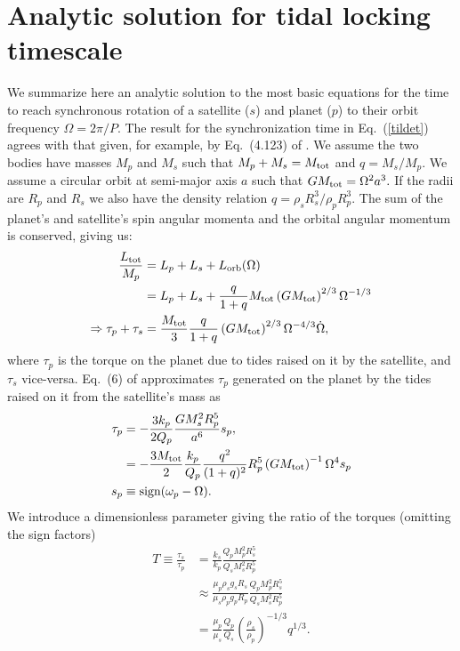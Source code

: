 \documentclass[onecolumn]{aastex631}
\begin{document}
\section{Analytic solution for tidal locking timescale}
\label{analytic}
We summarize here an analytic solution to the most basic equations for the time to reach synchronous rotation of a satellite ($s$) and planet ($p$) to their orbit frequency $\Omega = 2\pi/P.$ The result for the synchronization time in Eq.~(\ref{tildet}) agrees with that given, for example, by Eq.~(4.123) of \citet{MD2000}. We assume the two bodies have masses $M_p$ and $M_s$ such that $M_p+M_s=M_{\rm tot}$ and $q=M_s/M_p.$  We assume a circular orbit at semi-major axis $a$ such that $GM_{\rm tot}=\Omega^2 a^3.$  If the radii are $R_p$ and $R_s$ we also have the density relation $q = \rho_s R^3_s / \rho_p R^3_p.$  The sum of the planet's and satellite's spin angular momenta and the orbital angular momentum is conserved, giving us:
\begin{align}
  \frac{L_{\rm tot}}{M_p} & = L_p + L_s + L_{\rm orb}(\Omega) \nonumber \\
                          & = L_p + L_s + \frac{q}{1+q} M_{\rm tot} \left(GM_{\rm tot}\right)^{2/3} \Omega^{-1/3}
                            \label{Lcons} \\
  \Rightarrow \tau_p + \tau_s & = \frac{M_{\rm tot}}{3} \frac{q}{1+q} \left(GM_{\rm tot}\right)^{2/3} \Omega^{-4/3} \dot\Omega,
  \label{dLdt}
\end{align}
where $\tau_p$ is the torque on the planet due to tides raised on it by the satellite, and $\tau_s$ vice-versa.
Eq.~(6) of \citet{Goldreich68} approximates $\tau_p$ generated on the planet by the tides raised on it from the satellite's mass as
\begin{align}
  \tau_p & = -\frac{3k_p}{2Q_p} \frac{ GM_s^2 R_p^5}{a^6} s_p, \nonumber \\
         & = -\frac{3M_{\rm tot}}{2} \frac{k_p}{Q_p} \frac{q^2}{(1+q)^2} R_p^5 \left(GM_{\rm tot}\right)^{-1} \Omega^4 s_p
           \label{taup} \\
  s_p & \equiv \textrm{sign}(\omega_p-\Omega).\nonumber 
\end{align}           
We introduce a dimensionless parameter giving the ratio of the torques (omitting the sign factors)
\begin{align}
  T \equiv \frac{\tau_s}{\tau_p} & = \frac{k_s}{k_p} \frac{ Q_p M_p^2 R_s^5}{ Q_s M_s^2 R_p^5} \nonumber \\
                                 & \approx \frac{\mu_p \rho_s g_s R_s}{ \mu_s \rho_p g_p R_p} \frac{ Q_p M_p^2 R_s^5}{ Q_s M_s^2 R_p^5} \nonumber \\
                                 & = \frac{\mu_p}{\mu_s} \frac{Q_p}{Q_s} \left(\frac{\rho_s}{\rho_p}\right)^{-1/3} q^{1/3} \label{tratio}.
\end{align}
\end{document}
